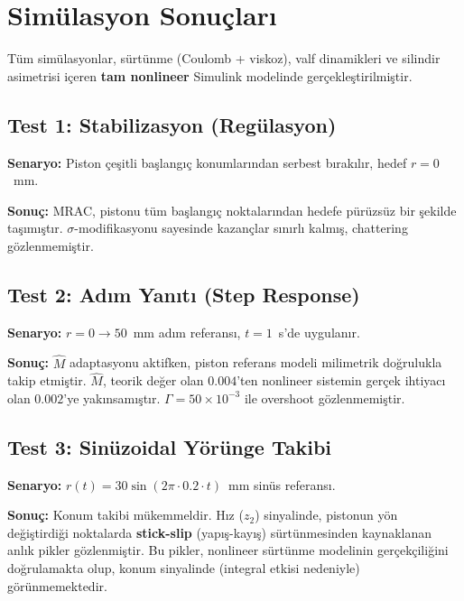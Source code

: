 \documentclass[12pt,a4paper]{article}
\begin{document}
\section{Simülasyon Sonuçları}
\label{sec:results}

Tüm simülasyonlar, sürtünme (Coulomb + viskoz), valf dinamikleri ve silindir asimetrisi içeren \textbf{tam nonlineer} Simulink modelinde gerçekleştirilmiştir.

\subsection{Test 1: Stabilizasyon (Regülasyon)}

\textbf{Senaryo:} Piston çeşitli başlangıç konumlarından serbest bırakılır, hedef $r = 0$~mm.

\textbf{Sonuç:} MRAC, pistonu tüm başlangıç noktalarından hedefe pürüzsüz bir şekilde taşımıştır. $\sigma$-modifikasyonu sayesinde kazançlar sınırlı kalmış, chattering gözlenmemiştir.

\subsection{Test 2: Adım Yanıtı (Step Response)}

\textbf{Senaryo:} $r = 0 \to 50$~mm adım referansı, $t = 1$~s'de uygulanır.

\textbf{Sonuç:} $\hat{M}$ adaptasyonu aktifken, piston referans modeli milimetrik doğrulukla takip etmiştir. $\hat{M}$, teorik değer olan $0.004$'ten nonlineer sistemin gerçek ihtiyacı olan $0.002$'ye yakınsamıştır. $\Gamma = 50 \times 10^{-3}$ ile overshoot gözlenmemiştir.

\subsection{Test 3: Sinüzoidal Yörünge Takibi}

\textbf{Senaryo:} $r(t) = 30\sin(2\pi \cdot 0.2 \cdot t)$~mm sinüs referansı.

\textbf{Sonuç:} Konum takibi mükemmeldir. Hız ($z_2$) sinyalinde, pistonun yön değiştirdiği noktalarda \textbf{stick-slip} (yapış-kayış) sürtünmesinden kaynaklanan anlık pikler gözlenmiştir. Bu pikler, nonlineer sürtünme modelinin gerçekçiliğini doğrulamakta olup, konum sinyalinde (integral etkisi nedeniyle) görünmemektedir.
\end{document}
